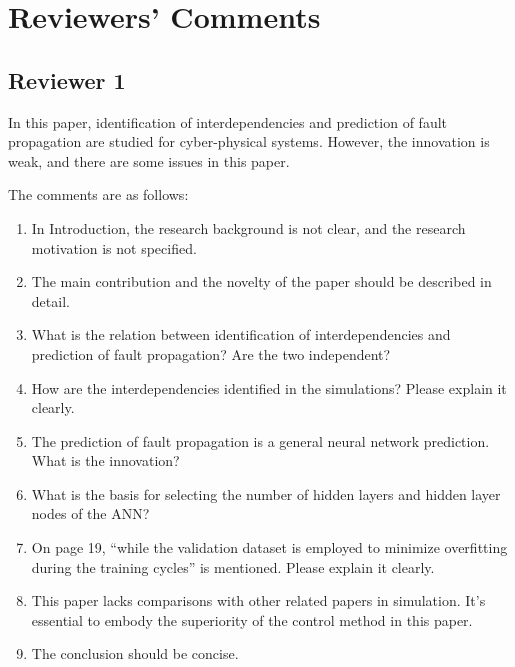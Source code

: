 \documentclass{article}
\begin{document}
\section{Reviewers' Comments}
\label{sec:reviewers}

\subsection{Reviewer 1}
\label{sec:reviewer:r1}
In this paper, identification of interdependencies and prediction of fault propagation are studied for cyber-physical systems. However, the innovation is weak, and there are some issues in this paper.

The comments are as follows:

\begin{enumerate}
  \item In Introduction, the research background is not clear, and the research motivation is not specified.
  \item The main contribution and the novelty of the paper should be described in detail.
  \item What is the relation between identification of interdependencies and prediction of fault propagation? Are the two independent?
  \item How are the interdependencies identified in the simulations? Please explain it clearly.
  \item The prediction of fault propagation is a general neural network prediction. What is the innovation?
  \item What is the basis for selecting the number of hidden layers and hidden layer nodes of the ANN?
  \item On page 19, ``while the validation dataset is employed to minimize overfitting during the training cycles'' is mentioned. Please explain it clearly.
  \item This paper lacks comparisons with other related papers in simulation. It’s essential to embody the superiority of the control method in this paper.
  \item The conclusion should be concise.
\end{enumerate}
\end{document}
